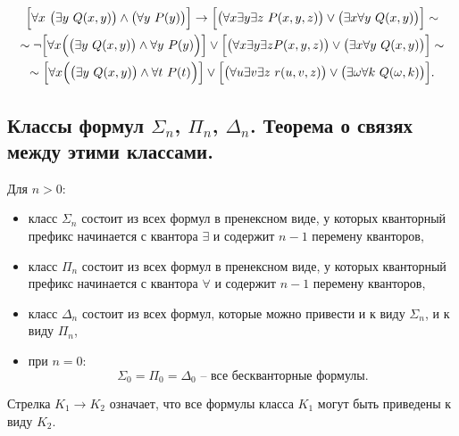 \begin{example}
    \begin{multline*}
        \Big[\forall x \ \big(\exists y \ Q(x,y)\big) \land \big(\forall y \ P(y)\big)\Big] \rightarrow \Big[\big(\forall x \exists y \exists z \ P(x,y,z)\big) \lor \bigl(\exists x \forall y \ Q(x,y)\bigr)\Big] \sim \\
        \sim \lnot\Big[\forall x \Big(\big(\exists y \ Q(x,y)\big) \land \forall y \ P(y)\Big)\Big] \lor \Big[\bigl(\forall x \exists y \exists z P(x,y,z)\bigr) \lor\bigl(\exists x \forall y \ Q(x,y)\bigr)\Big] \sim \\
        \sim \Big[\forall x \Bigl(\bigl(\exists y \ Q(x,y)\bigr)\land \forall t \ P(t)\Bigr)\Big] \lor \Big[\bigl(\forall u \exists v \exists z \ r(u,v,z)\bigr) \lor\bigl(\exists\omega \forall k \ Q(\omega,k)\bigr)\Big].
    \end{multline*}
\end{example}

\subsection{Классы формул $\Sigma_n$, $\Pi_n$, $\Delta_n$. Теорема о связях между этими классами.}

\begin{definition}
    Для $ n > 0 $:
    \begin{itemize}
        \item класс $ \Sigma_n $ состоит из всех формул в пренексном виде, у которых кванторный префикс начинается с квантора $ \exists $ и содержит $ n-1 $ перемену кванторов,
        \item класс $ \Pi_n $ состоит из всех формул в пренексном виде, у которых кванторный префикс начинается с квантора $ \forall $ и содержит $ n-1 $ перемену кванторов,
        \item класс $ \Delta_n $ состоит из всех формул, которые можно привести и к виду $ \Sigma_n $, и к виду $ \Pi_n $,
        \item при $ n=0 $:
              \[
                  \Sigma_0 = \Pi_0 = \Delta_0 \text{ -- все бескванторные формулы}.
              \]
    \end{itemize}

    Стрелка $ K_1 \rightarrow K_2 $ означает, что все формулы класса $ K_1 $ могут быть приведены к виду $ K_2 $.
\end{definition}

